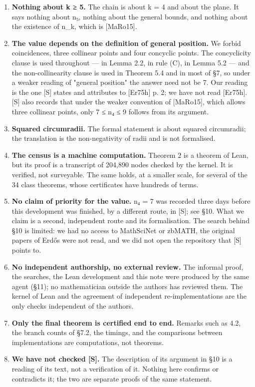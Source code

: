 \documentclass[11pt,a4paper]{article}
\theoremstyle{named}
\begin{document}
\begin{enumerate}[leftmargin=1.4em,itemsep=.2em,topsep=.3em]
\item \textbf{Nothing about k ≥ 5.} The chain is about k = 4 and about the plane. It says nothing about n₅, nothing about the general bounds, and nothing about the existence of n\_k, which is [MaRo15].
\item \textbf{The value depends on the definition of general position.} We forbid coincidences, three collinear points and four concyclic points. The concyclicity clause is used throughout — in Lemma 2.2, in rule (C), in Lemma 5.2 — and the non-collinearity clause is used in Theorem 5.4 and in most of §7, so under a weaker reading of "general position" the answer need not be 7. Our reading is the one [S] states and attributes to [Er75h] p. 2; we have not read [Er75h]. [S] also records that under the weaker convention of [MaRo15], which allows three collinear points, only 7 ≤ n₄ ≤ 9 follows from its argument.
\item \textbf{Squared circumradii.} The formal statement is about squared circumradii; the translation is the non-negativity of radii and is not formalised.
\item \textbf{The census is a machine computation.} Theorem 2 is a theorem of Lean, but its proof is a transcript of 204,890 nodes checked by the kernel. It is verified, not surveyable. The same holds, at a smaller scale, for several of the 34 class theorems, whose certificates have hundreds of terms.
\item \textbf{No claim of priority for the value.} n₄ = 7 was recorded three days before this development was finished, by a different route, in [S]; see §10. What we claim is a second, independent route and its formalisation. The search behind §10 is limited: we had no access to MathSciNet or zbMATH, the original papers of Erdős were not read, and we did not open the repository that [S] points to.
\item \textbf{No independent authorship, no external review.} The informal proof, the searches, the Lean development and this note were produced by the same agent (§11); no mathematician outside the authors has reviewed them. The kernel of Lean and the agreement of independent re-implementations are the only checks independent of the authors.
\item \textbf{Only the final theorem is certified end to end.} Remarks such as 4.2, the branch counts of §7.2, the timings, and the comparisons between implementations are computations, not theorems.
\item \textbf{We have not checked [S].} The description of its argument in §10 is a reading of its text, not a verification of it. Nothing here confirms or contradicts it; the two are separate proofs of the same statement.
\end{enumerate}
\end{document}
